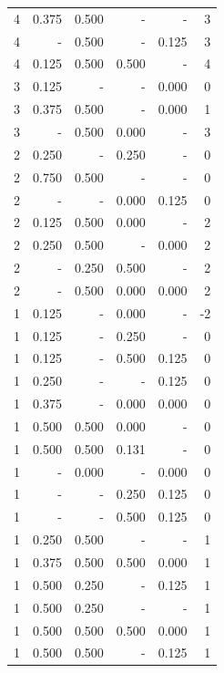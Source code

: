 \documentclass[a4paper]{article}\usepackage{graphicx, color}
\begin{document}
\begin{table}[ht]
\begin{tabular}{rrrrrr}
  4 & 0.375 & 0.500 & - & - & 3 \\ 
  4 & - & 0.500 & - & 0.125 & 3 \\ 
   \rowcolor{goodColor} 4 & 0.125 & 0.500 & 0.500 & - & 4 \\ 
   \rowcolor{nullColor} 3 & 0.125 & - & - & 0.000 & 0 \\ 
  3 & 0.375 & 0.500 & - & 0.000 & 1 \\ 
   \rowcolor{badColor} 3 & - & 0.500 & 0.000 & - & 3 \\ 
   \rowcolor{sosoColor} 2 & 0.250 & - & 0.250 & - & 0 \\ 
  2 & 0.750 & 0.500 & - & - & 0 \\ 
   \rowcolor{sosoColor} 2 & - & - & 0.000 & 0.125 & 0 \\ 
   \rowcolor{badColor} 2 & 0.125 & 0.500 & 0.000 & - & 2 \\ 
  2 & 0.250 & 0.500 & - & 0.000 & 2 \\ 
   \rowcolor{badColor} 2 & - & 0.250 & 0.500 & - & 2 \\ 
   \rowcolor{badColor} 2 & - & 0.500 & 0.000 & 0.000 & 2 \\ 
   \rowcolor{sosoColor} 1 & 0.125 & - & 0.000 & - & -2 \\ 
   \rowcolor{sosoColor} 1 & 0.125 & - & 0.250 & - & 0 \\ 
   \rowcolor{sosoColor} 1 & 0.125 & - & 0.500 & 0.125 & 0 \\ 
   \rowcolor{nullColor} 1 & 0.250 & - & - & 0.125 & 0 \\ 
   \rowcolor{sosoColor} 1 & 0.375 & - & 0.000 & 0.000 & 0 \\ 
   \rowcolor{badColor} 1 & 0.500 & 0.500 & 0.000 & - & 0 \\ 
   \rowcolor{badColor} 1 & 0.500 & 0.500 & 0.131 & - & 0 \\ 
  1 & - & 0.000 & - & 0.000 & 0 \\ 
   \rowcolor{sosoColor} 1 & - & - & 0.250 & 0.125 & 0 \\ 
   \rowcolor{sosoColor} 1 & - & - & 0.500 & 0.125 & 0 \\ 
  1 & 0.250 & 0.500 & - & - & 1 \\ 
   \rowcolor{goodColor} 1 & 0.375 & 0.500 & 0.500 & 0.000 & 1 \\ 
  1 & 0.500 & 0.250 & - & 0.125 & 1 \\ 
  1 & 0.500 & 0.250 & - & - & 1 \\ 
   \rowcolor{goodColor} 1 & 0.500 & 0.500 & 0.500 & 0.000 & 1 \\ 
  1 & 0.500 & 0.500 & - & 0.125 & 1 \\ 

\end{tabular}
\end{table}
\end{document}
